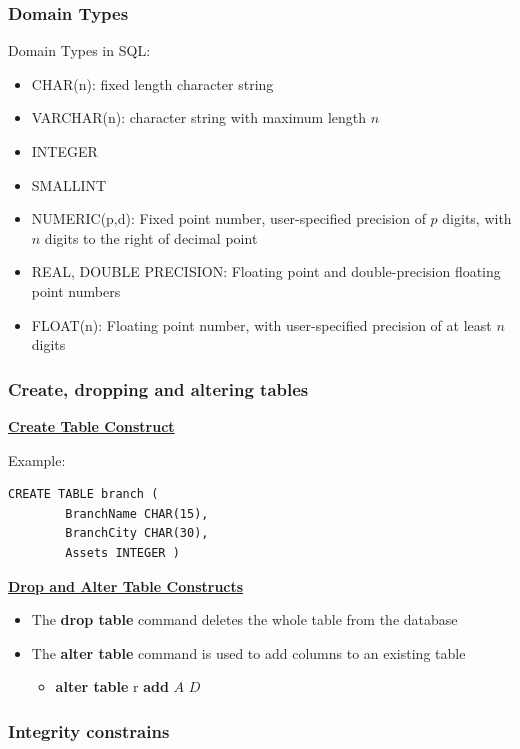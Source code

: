 \subsubsection{Domain Types}
Domain Types in SQL:
\begin{itemize}[label=\(\rhd\)]
    \item CHAR(n): fixed length character string
    \item VARCHAR(n): character string with maximum length $n$
    \item INTEGER
    \item SMALLINT
    \item NUMERIC(p,d): Fixed point number, user-specified precision of $p$ digits, with $n$ digits to the right of decimal point
    \item REAL, DOUBLE PRECISION: Floating point and double-precision floating point numbers
    \item FLOAT(n): Floating point number, with user-specified precision of at least $n$ digits
\end{itemize}
\subsubsection{Create, dropping and altering tables}
\textbf{\underline{Create Table Construct}}
\bigskip

Example: 
\begin{lstlisting}[caption= Create Table Example]
    CREATE TABLE branch (
        BranchName CHAR(15),
        BranchCity CHAR(30),
        Assets INTEGER )
\end{lstlisting}

\textbf{\underline{Drop and Alter Table Constructs}}
\bigskip
\begin{itemize}[label=\(\rhd\)]
    \item The \textbf{drop table} command deletes the whole table from the database
    \item The \textbf{alter table} command is used to add columns to an existing table
    \begin{itemize}[label=\(\rhd\)]
        \item[] \textbf{alter table} r \textbf{add} $A$ $D$ 
    \end{itemize}
\end{itemize}


\subsubsection{Integrity constrains}


